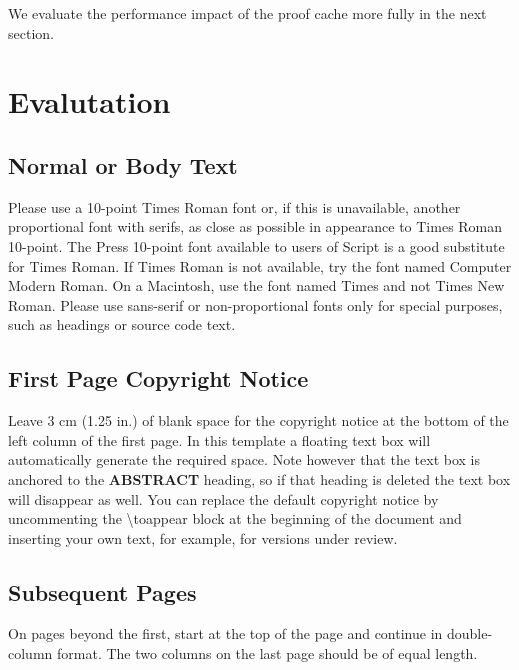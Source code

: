 \documentclass{sigchi}
\begin{document}
We evaluate the performance impact of the proof cache more fully in the next section.

\section{Evalutation}

\subsection{Normal or Body Text}

Please use a 10-point Times Roman font or, if this is unavailable,
another proportional font with serifs, as close as possible in
appearance to Times Roman 10-point. The Press 10-point font available
to users of Script is a good substitute for Times Roman. If Times
Roman is not available, try the font named Computer Modern Roman. On a
Macintosh, use the font named Times and not Times New Roman. Please
use sans-serif or non-proportional fonts only for special purposes,
such as headings or source code text.

\subsection{First Page Copyright Notice}

Leave 3 cm (1.25 in.) of blank space for the copyright notice at the
bottom of the left column of the first page. In this template a
floating text box will automatically generate the required space. Note
however that the text box is anchored to the \textbf{ABSTRACT}
heading, so if that heading is deleted the text box will disappear as
well.  You can replace the default copyright notice by uncommenting
the {\textbackslash}toappear block at the beginning of the document
and inserting your own text, for example, for versions under review.

\subsection{Subsequent Pages}

On pages beyond the first, start at the top of the page and continue
in double-column format.  The two columns on the last page should be
of equal length.
\end{document}
